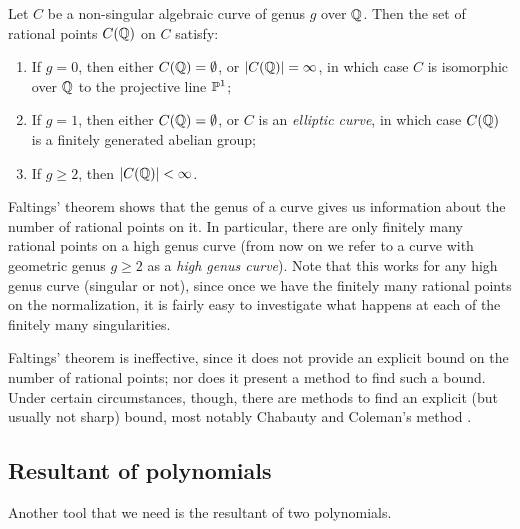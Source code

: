 \begin{theorem}
  \label{th:faltings}
  Let $C$ be a non-singular algebraic curve of genus $g$ over
  $\Q$. Then the set of rational points $C(\Q)$ on $C$ satisfy:
  \begin{enumerate}
  \item If $g = 0$, then either $C(\Q) = \es$, or $|C(\Q)| = \infty$,
    in which case $C$ is isomorphic over $\Q$ to the projective line
    $\P^1$;

  \item If $g = 1$, then either $C(\Q) = \es$, or $C$ is an
    \emph{elliptic curve}, in which case $C(\Q)$ is a finitely
    generated abelian group;

  \item If $g \ge 2$, then $|C(\Q)| < \infty$.
  \end{enumerate}
\end{theorem}

Faltings' theorem shows that the genus of a curve gives us information
about the number of rational points on it. In particular, there are
only finitely many rational points on a high genus curve (from now on
we refer to a curve with geometric genus $g \ge 2$ as a \emph{high
  genus curve}). Note that this works for any high genus curve
(singular or not), since once we have the finitely many rational
points on the normalization, it is fairly easy to investigate what
happens at each of the finitely many singularities.

\begin{remark}
  Faltings' theorem is ineffective, since it does not provide an
  explicit bound on the number of rational points; nor does it present
  a method to find such a bound. Under certain circumstances, though,
  there are methods to find an explicit (but usually not sharp) bound,
  most notably Chabauty and Coleman's method \cite{MR808103}.
\end{remark}

\subsection{Resultant of polynomials}

Another tool that we need is the resultant of two polynomials.

